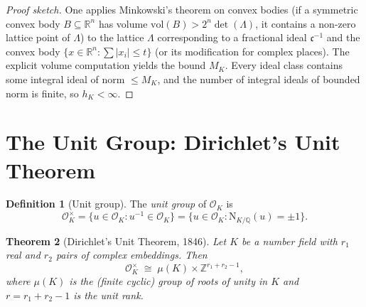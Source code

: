 \documentclass[12pt,a4paper]{amsart}
\newtheorem{theorem}{Theorem}[section]
\theoremstyle{definition}
\newtheorem{definition}[theorem]{Definition}
\newcommand{\Z}{\mathbb{Z}}
\newcommand{\Q}{\mathbb{Q}}
\newcommand{\R}{\mathbb{R}}
\newcommand{\OK}{\mathcal{O}_K}
\newcommand{\Nm}{\mathrm{N}}
\begin{document}
\begin{proof}[Proof sketch]
One applies Minkowski's theorem on convex bodies (if a symmetric convex
body $B \subseteq \R^n$ has volume $\text{vol}(B) > 2^n \det(\Lambda)$,
it contains a non-zero lattice point of $\Lambda$) to the lattice $\Lambda$
corresponding to a fractional ideal $\mathfrak{c}^{-1}$ and the convex body
$\{x \in \R^n : \sum |x_i| \le t\}$ (or its modification for complex places).
The explicit volume computation yields the bound $M_K$.
Every ideal class contains some integral ideal of norm $\le M_K$, and the
number of integral ideals of bounded norm is finite, so $h_K < \infty$.
\end{proof}

\section{The Unit Group: Dirichlet's Unit Theorem}

\begin{definition}[Unit group]
The \emph{unit group} of $\OK$ is
\[
  \OK^\times = \{u \in \OK : u^{-1} \in \OK\} = \{u \in \OK : \Nm_{K/\Q}(u) = \pm 1\}.
\]
\end{definition}

\begin{theorem}[Dirichlet's Unit Theorem, 1846]
\label{thm:dirichlet_unit}
Let $K$ be a number field with $r_1$ real and $r_2$ pairs of complex
embeddings.  Then
\[
  \OK^\times \;\cong\; \mu(K) \times \Z^{r_1 + r_2 - 1},
\]
where $\mu(K)$ is the (finite cyclic) group of roots of unity in $K$ and
$r = r_1 + r_2 - 1$ is the \emph{unit rank}.
\end{theorem}
\end{document}
